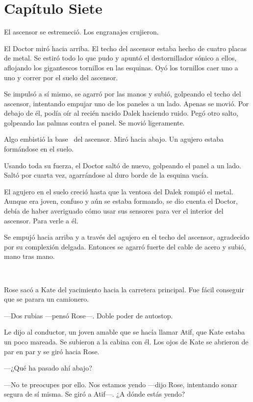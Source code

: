 \chapter*{Capítulo Siete}

El ascensor se estremeció. Los engranajes crujieron.

El Doctor miró hacia arriba. El techo del ascensor estaba hecho de
cuatro placas de metal. Se estiró todo lo que pudo y apuntó el
destornillador sónico a ellos, aflojando los gigantescos tornillos en
las esquinas. Oyó los tornillos caer uno a uno y correr por el suelo del
ascensor.

Se impulsó a sí mismo, se agarró por las manos y subió, golpeando el
techo del ascensor, intentando empujar uno de los paneles a un lado.
Apenas se movió. Por debajo de él, podía oír al recién nacido Dalek
haciendo ruido. Pegó otro salto, golpeando las palmas contra el panel.
Se movió ligeramente.

Algo embistió la base ~del ascensor. Miró hacia abajo. Un agujero estaba
formándose en el suelo.

Usando toda su fuerza, el Doctor saltó de nuevo, golpeando el panel a un
lado. Saltó por cuarta vez, agarrándose al duro borde de la esquina
vacía.

El agujero en el suelo creció hasta que la ventosa del Dalek rompió el
metal. Aunque era joven, confuso y aún se estaba formando, se dio cuenta
el Doctor, debía de haber averiguado cómo usar sus sensores para ver el
interior del ascensor. Para verle a él.

Se empujó hacia arriba y a través del agujero en el techo del ascensor,
agradecido por su complexión delgada. Entonces se agarró fuerte del
cable de acero y subió, mano tras mano.

~

Rose sacó a Kate del yacimiento hacia la carretera principal. Fue fácil
conseguir que se parara un camionero.

---Dos rubias ---pensó Rose---. Doble poder de autostop.

Le dijo al conductor, un joven amable que se hacía llamar Atif, que Kate
estaba un poco mareada. Se subieron a la cabina con él. Los ojos de Kate
se abrieron de par en par y se giró hacia Rose.

---¿Qué ha pasado ahí abajo?

---No te preocupes por ello. Nos estamos yendo ---dijo Rose, intentando
sonar segura de sí misma. Se giró a Atif---. ¿A dónde estás yendo?

